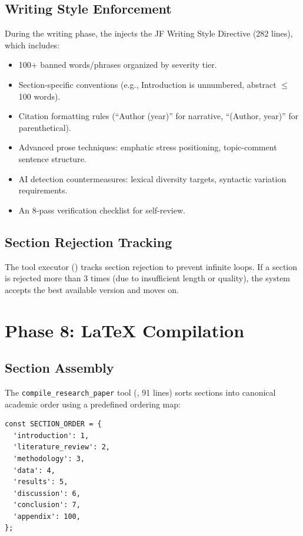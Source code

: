 \subsection{Writing Style Enforcement}

During the writing phase, the \governor injects the JF Writing Style Directive (282 lines), which includes:

\begin{itemize}
  \item 100+ banned words/phrases organized by severity tier.
  \item Section-specific conventions (e.g., Introduction is unnumbered, abstract $\leq$ 100 words).
  \item Citation formatting rules (``Author (year)'' for narrative, ``(Author, year)'' for parenthetical).
  \item Advanced prose techniques: emphatic stress positioning, topic-comment sentence structure.
  \item AI detection countermeasures: lexical diversity targets, syntactic variation requirements.
  \item An 8-pass verification checklist for self-review.
\end{itemize}

\subsection{Section Rejection Tracking}

The tool executor () tracks section rejection to prevent infinite loops.
If a section is rejected more than 3 times (due to insufficient length or quality), the system accepts the best available version and moves on.

\section{Phase 8: LaTeX Compilation}
\label{sec:pipeline:compilation}

\subsection{Section Assembly}

The \texttt{compile\_research\_paper} tool (, 91 lines) sorts sections into canonical academic order using a predefined ordering map:

\begin{lstlisting}[style=typescript, caption=Section ordering map.]
const SECTION_ORDER = {
  'introduction': 1,
  'literature_review': 2,
  'methodology': 3,
  'data': 4,
  'results': 5,
  'discussion': 6,
  'conclusion': 7,
  'appendix': 100,
};
\end{lstlisting}

